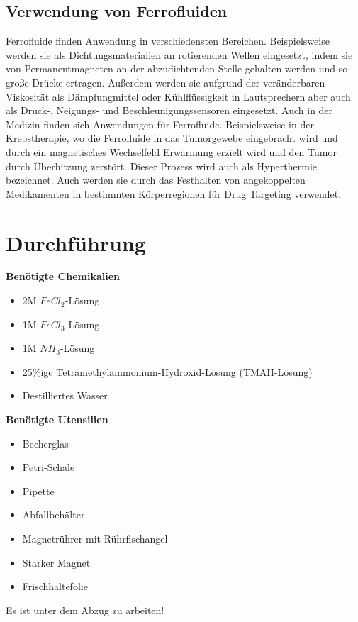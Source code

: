 \documentclass[a4paper]{TUBAFprotokoll}
\begin{document}
		\subsection{Verwendung von Ferrofluiden}
		Ferrofluide finden Anwendung in verschiedensten Bereichen. Beispielsweise werden sie als Dichtungsmaterialien an rotierenden Wellen eingesetzt, indem sie von Permanentmagneten an der abzudichtenden Stelle gehalten werden und so große Drücke ertragen. Außerdem werden sie aufgrund der veränderbaren Viskosität als Dämpfungmittel oder Kühlflüssigkeit in Lautsprechern aber auch als Druck-, Neigungs- und Beschleunigungssensoren eingesetzt. Auch in der Medizin finden sich Anwendungen für Ferrofluide. Beispielsweise in der Krebstherapie, wo die Ferrofluide in das Tumorgewebe eingebracht wird und durch ein magnetisches Wechselfeld Erwärmung erzielt wird und den Tumor durch Überhitzung zerstört. Dieser Prozess wird auch als Hyperthermie bezeichnet. Auch werden sie durch das Festhalten von angekoppelten Medikamenten in bestimmten Körperregionen für Drug Targeting verwendet.
		
		\section{Durchführung}
		\textbf{Benötigte Chemikalien}\\
		\begin{itemize}
			\item 2M $FeCl_2$-Lösung
			\item 1M $FeCl_3$-Lösung
			\item 1M $NH_3$-Lösung
			\item 25\%ige Tetramethylammonium-Hydroxid-Lösung (TMAH-Lösung)
			\item Destilliertes Wasser
		\end{itemize}
		\textbf{Benötigte Utensilien}
		\begin{itemize}
			\item Becherglas
			\item Petri-Schale
			\item Pipette
			\item Abfallbehälter
			\item Magnetrührer mit Rührfischangel
			\item Starker Magnet
			\item Frischhaltefolie
		\end{itemize}
		Es ist unter dem Abzug zu arbeiten!\\
		\newline
		
\end{document}
